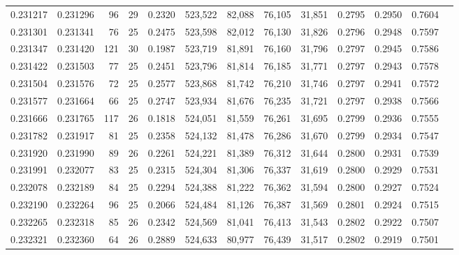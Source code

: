 \begin{tabular}{rrrrrrrrrrrrr}
0.231217 & 0.231296 &  96 &  29 &                                     0.2320 & 523,522 &  82,088 &  76,105 &  31,851 & 0.2795 & 0.2950 & 0.7604 \\
0.231301 & 0.231341 &  76 &  25 &                                     0.2475 & 523,598 &  82,012 &  76,130 &  31,826 & 0.2796 & 0.2948 & 0.7597 \\
0.231347 & 0.231420 & 121 &  30 &                                     0.1987 & 523,719 &  81,891 &  76,160 &  31,796 & 0.2797 & 0.2945 & 0.7586 \\
0.231422 & 0.231503 &  77 &  25 &                                     0.2451 & 523,796 &  81,814 &  76,185 &  31,771 & 0.2797 & 0.2943 & 0.7578 \\
0.231504 & 0.231576 &  72 &  25 &                                     0.2577 & 523,868 &  81,742 &  76,210 &  31,746 & 0.2797 & 0.2941 & 0.7572 \\
0.231577 & 0.231664 &  66 &  25 &                                     0.2747 & 523,934 &  81,676 &  76,235 &  31,721 & 0.2797 & 0.2938 & 0.7566 \\
0.231666 & 0.231765 & 117 &  26 &                                     0.1818 & 524,051 &  81,559 &  76,261 &  31,695 & 0.2799 & 0.2936 & 0.7555 \\
0.231782 & 0.231917 &  81 &  25 &                                     0.2358 & 524,132 &  81,478 &  76,286 &  31,670 & 0.2799 & 0.2934 & 0.7547 \\
0.231920 & 0.231990 &  89 &  26 &                                     0.2261 & 524,221 &  81,389 &  76,312 &  31,644 & 0.2800 & 0.2931 & 0.7539 \\
0.231991 & 0.232077 &  83 &  25 &                                     0.2315 & 524,304 &  81,306 &  76,337 &  31,619 & 0.2800 & 0.2929 & 0.7531 \\
0.232078 & 0.232189 &  84 &  25 &                                     0.2294 & 524,388 &  81,222 &  76,362 &  31,594 & 0.2800 & 0.2927 & 0.7524 \\
0.232190 & 0.232264 &  96 &  25 &                                     0.2066 & 524,484 &  81,126 &  76,387 &  31,569 & 0.2801 & 0.2924 & 0.7515 \\
0.232265 & 0.232318 &  85 &  26 &                                     0.2342 & 524,569 &  81,041 &  76,413 &  31,543 & 0.2802 & 0.2922 & 0.7507 \\
0.232321 & 0.232360 &  64 &  26 &                                     0.2889 & 524,633 &  80,977 &  76,439 &  31,517 & 0.2802 & 0.2919 & 0.7501 \\

\end{tabular}
